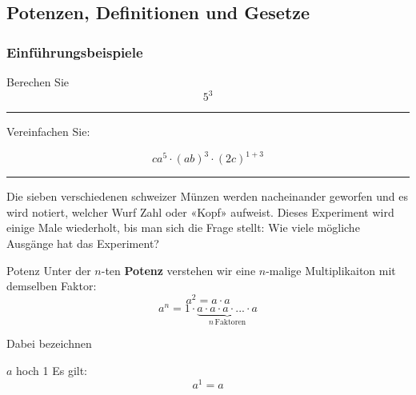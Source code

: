 \newcommand{\aaaa}{a\cdot a \cdot a \cdot{} ... \cdot a}
\newcommand{\bbbb}{b\cdot b \cdot b \cdot{} ... \cdot b}

\newpage
\subsection{Potenzen, Definitionen und Gesetze}

\subsubsection{Einführungsbeispiele}

Berechen Sie
$$5^3$$


\hrule

Vereinfachen Sie:

$$ca^5\cdot(ab)^3\cdot{}(2c)^{1+3}$$


\hrule

Die sieben verschiedenen schweizer Münzen werden nacheinander geworfen
und es wird notiert, welcher Wurf Zahl oder «Kopf» aufweist. Dieses
Experiment wird einige Male wiederholt, bis man sich die Frage stellt:
Wie viele mögliche Ausgänge hat das Experiment?




\begin{definition}{Potenz}{}
Unter der $n$-ten \textbf{Potenz} verstehen wir eine $n$-malige Multiplikaiton mit demselben Faktor:
$$a^2 = a\cdot a$$
$$a^n = 1\cdot{} \underbrace{\aaaa}_{n\, \text{Faktoren}}$$
\end{definition}
Dabei bezeichnen


\begin{gesetz}{$a$ hoch 1}{}
  Es gilt:
  $$a^1 = a$$
\end{gesetz}



